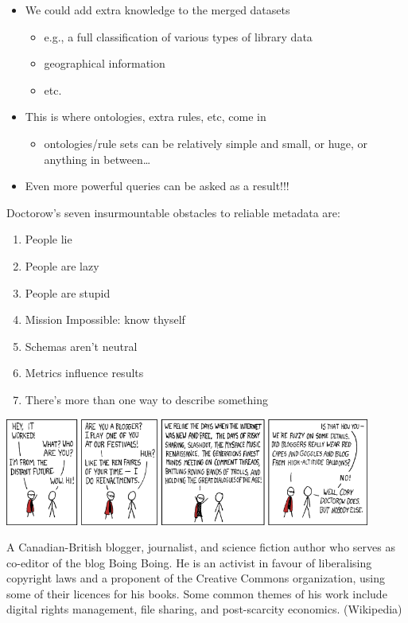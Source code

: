 \documentclass[a4paper,landscape,headrule,footrule,xetex]{foils}
\begin{document}
\begin{itemize}
\item We could add extra knowledge to the merged datasets
  \begin{itemize}
  \item e.g., a full classification of various types of library data
  \item geographical information
  \item etc.
  \end{itemize}
\item This is where ontologies, extra rules, etc, come in
  \begin{itemize}
  \item ontologies/rule sets can be relatively simple and small, or huge, or anything in between…
  \end{itemize}
\item Even more powerful queries can be asked as a result!!!

\end{itemize}




Doctorow's seven insurmountable obstacles to reliable metadata are:
\begin{enumerate}
\item  People lie
\item  People are lazy
\item  People are stupid
\item  Mission Impossible: know thyself
\item  Schemas aren't neutral
\item  Metrics influence results
\item  There's more than one way to describe something
\end{enumerate}



\includegraphics[width=0.9\textwidth]{../pics/blagofaire.png}

A Canadian-British blogger, journalist, and science fiction author who
serves as co-editor of the blog Boing Boing. He is an activist in
favour of liberalising copyright laws and a proponent of the Creative
Commons organization, using some of their licences for his books. Some
common themes of his work include digital rights management, file
sharing, and post-scarcity economics. (Wikipedia) 
\end{document}

